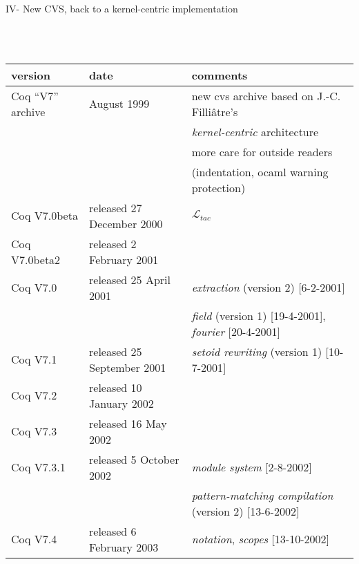 \documentclass[a4paper]{book}
\newcommand{\feature}[1]{{\em #1}}
\begin{document}
\newpage
\centerline{IV- New CVS, back to a kernel-centric implementation}
\mbox{}\\
\mbox{}\\
\begin{tabular}{l|l|l}
version & date & comments \\
\hline
Coq ``V7'' archive & August 1999 & new cvs archive based on J.-C. Filliâtre's \\
   & & \feature{kernel-centric} architecture \\
   & & more care for outside readers\\
   & & (indentation, ocaml warning protection)\\
Coq V7.0beta& released 27 December 2000 & \feature{${\mathcal{L}}_{\mathit{tac}}$} \\
Coq V7.0beta2& released 2 February 2001\\

Coq V7.0& released 25 April 2001 & \feature{extraction} (version 2) [6-2-2001] \\
  & & \feature{field} (version 1) [19-4-2001], \feature{fourier} [20-4-2001] \\

Coq V7.1& released 25 September 2001 & \feature{setoid rewriting} (version 1) [10-7-2001]\\

Coq V7.2& released 10 January 2002\\

Coq V7.3& released 16 May 2002\\

Coq V7.3.1& released 5 October 2002 & \feature{module system} [2-8-2002]\\
  & & \feature{pattern-matching compilation} (version 2) [13-6-2002]\\

Coq V7.4& released 6 February 2003 & \feature{notation}, \feature{scopes} [13-10-2002]\\
\end{tabular}

\medskip
\bigskip
\end{document}
